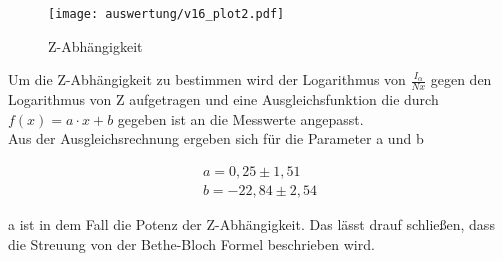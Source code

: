 \begin{figure}[H]
	\centering
	\texttt{[image: auswertung/v16\_plot2.pdf]}
	\caption{Z-Abhängigkeit}
	\label{img:grafik-dummy}
\end{figure}

Um die Z-Abhängigkeit zu bestimmen wird der Logarithmus von $\frac{I_\alpha}{Nx}$ gegen den Logarithmus von Z aufgetragen und eine Ausgleichsfunktion die durch $f(x)=a\cdot x+b$ gegeben ist an die Messwerte angepasst. \\
Aus der Ausgleichsrechnung ergeben sich für die Parameter a und b

\begin{align*}
a= 0,25 \pm 1,51 
\\
b= -22,84 \pm 2,54 
\end{align*}

a ist in dem Fall die Potenz der Z-Abhängigkeit. Das lässt drauf schließen, dass die Streuung von der Bethe-Bloch Formel beschrieben wird.


